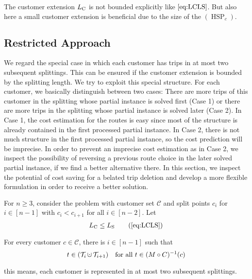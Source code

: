 \begin{remark}

The customer extension $L_{\operatorname{C}}$ is not bounded explicitly like $\eqref{eq:LCLS}$. But also here a small customer extension is beneficial due to the size of the $(\operatorname{HSP}_c)$.

\end{remark}


\subsection{Restricted Approach}
\label{sec:restricted_approach}

We regard the special case in which each customer has trips in at most two subsequent splittings. This can be ensured if the customer extension is bounded by the splitting length. We try to exploit this special structure. For each customer, we basically distinguish between two cases: There are more trips of this customer in the splitting whose partial instance is solved first (Case 1) or there are more trips in the splitting whose partial instance is solved later (Case 2). In Case 1, the cost estimation for the routes is easy since most of the structure is already contained in the first processed partial instance. In Case 2, there is not much structure in the first processed partial instance, so the cost prediction will be imprecise. In order to prevent an imprecise cost estimation as in Case 2, we inspect the possibility of reversing a previous route choice in the later solved partial instance, if we find a better alternative there. In this section, we inspect the potential of cost saving for a belated trip deletion and develop a more flexible formulation in order to receive a better solution.

\begin{lemma}

For $n\geq 3$, consider the problem with customer set $\mathcal{C}$ and split points $c_i$ for ${i\in[n-1]}$ with $c_i<c_{i+1}$ for all $i\in[n-2]$. Let
\begin{align}
	L_{\operatorname{C}}\leq L_{\operatorname{S}} \tag{\ref{eq:LCLS}}
\end{align}

For every customer $c\in\mathcal{C}$, there is $i\in[n-1]$ such that
\begin{align}
	t\in\left(\Ti\cupdot\mathcal{T}_{i+1}\right) && \text{for all } t\in (M\circ C)^{-1}(c)
\end{align}

this means, each customer is represented in at most two subsequent splittings.

\end{lemma}

